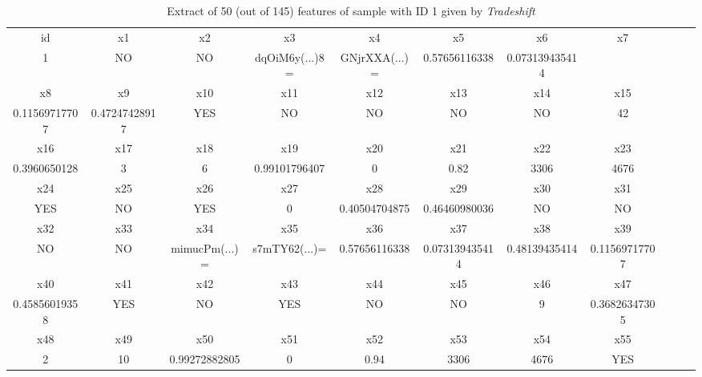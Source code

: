 \documentclass[a4paper]{article}
\begin{document}
\begin{sidewaystable}
    \centering
	\begin{tabular}{ccccccccccc}

		id & x1 & x2 & x3 & x4 & x5 & x6 & x7\\ 
		1 & NO & NO & dqOiM6y(...)8= & GNjrXXA(...)= & 0.57656116338 & 0.073139435414 \\
		\hline

		x8 & x9 & x10 & x11 & x12 & x13 & x14 & x15 \\
		0.11569717707 & 0.47247428917 & YES & NO & NO & NO & NO & 42 \\
		\hline

		x16 & x17 & x18 & x19 & x20 & x21 & x22 & x23 \\
		0.3960650128 & 3 & 6 & 0.99101796407 & 0 & 0.82 & 3306 & 4676 \\
		\hline

		x24 & x25 & x26 & x27 & x28 & x29 & x30 & x31 \\
		YES & NO & YES & 0 & 0.40504704875 & 0.46460980036 & NO & NO \\
		\hline

		x32 & x33 & x34 & x35 & x36 & x37 & x38 & x39 \\
		NO & NO & mimucPm(...)= & s7mTY62(...)= & 0.57656116338 & 0.073139435414 & 0.48139435414 & 0.11569717707 \\
		\hline

		x40 & x41 & x42 & x43 & x44 & x45 & x46 & x47 \\
		0.45856019358 & YES & NO & YES & NO & NO & 9 & 0.36826347305 \\
		\hline

		x48 & x49 & x50 & x51 & x52 & x53 & x54 & x55 \\
		2 & 10 & 0.99272882805 & 0 & 0.94 & 3306 & 4676 & YES \\
		

	\end{tabular}
	\caption{Extract of 50 (out of 145) features of sample with ID 1 given by \textit{Tradeshift} }
	\label{fig:inputVector}
\end{sidewaystable}
\end{document}
